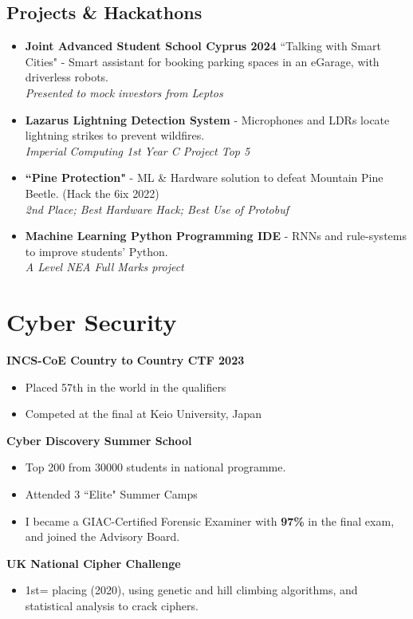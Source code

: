 \documentclass{Resume}
\begin{document}
		\subsection{Projects \& Hackathons}
			\begin{itemize}

               \item \textbf{Joint Advanced Student School Cyprus 2024} ``Talking with Smart Cities" - Smart assistant for booking parking spaces in an eGarage, with driverless robots.\\
               \textit{Presented to mock investors from Leptos}
   
            \item \textbf{Lazarus Lightning Detection System} - Microphones and LDRs locate lightning strikes to prevent wildfires.\\ \textit{Imperial Computing 1st Year C Project Top 5}
            
            \item \textbf{``Pine Protection"} - ML \& Hardware solution to defeat Mountain Pine Beetle. (Hack the 6ix 2022)\\ 
            \textit{2nd Place; Best Hardware Hack; Best Use of Protobuf}

            \item \textbf{Machine Learning Python Programming IDE} - RNNs and rule-systems to improve students' Python. \\ \textit{A Level NEA Full Marks project}



    
				
			\end{itemize}
    
    \section{Cyber Security}
            \textbf{INCS-CoE Country to Country CTF 2023}
            \begin{itemize}
                \item Placed 57th in the world in the qualifiers
                \item Competed at the final at Keio University, Japan
            \end{itemize}
		\textbf{Cyber Discovery Summer School}
				\begin{itemize}
				    \item Top 200 from 30000 students in national programme.
				    \item Attended 3 ``Elite" Summer Camps
				    \item I became a GIAC-Certified Forensic Examiner with \textbf{97\%} in the final exam, and joined the Advisory Board.
				\end{itemize}
            \textbf{UK National Cipher Challenge}
		  \begin{itemize}
                \item 1st= placing (2020), using genetic and hill climbing algorithms, and statistical analysis to crack ciphers.
            \end{itemize}
            
\end{document}
